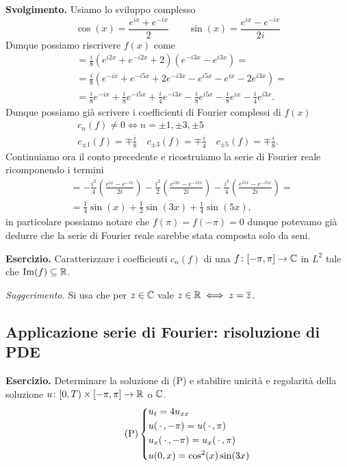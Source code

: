 \textbf{Svolgimento.}
Usiamo lo sviluppo complesso
$$
\cos(x) = \frac{e^{ix} + e^{-ix}}{2}
\qquad
\sin(x) = \frac{e^{ix} - e^{-ix}}{2i}
$$
Dunque possiamo riscrivere $f(x)$ come
$$
\begin{aligned}
	&= \frac{i}{8} \left( e^{i2x} + e^{-i2x} + 2 \right) \left( e^{-i3x} - e^{i3x} \right) = \\
	&= \frac{i}{8} \left( e^{-ix} + e^{-i5x} + 2e^{-i3x} - e^{i5x} - e^{ix} - 2e^{i3x} \right) = \\
	&= \frac{i}{8} e^{-ix} + \frac{i}{8} e^{-i5x} + \frac{i}{4} e^{-i3x} - \frac{i}{8} e^{i5x} - \frac{i}{8} e^{ix} - \frac{i}{4} e^{i3x}. 
\end{aligned}
$$
Dunque possiamo già scrivere i coefficienti di Fourier complessi di $f(x)$
$$
\begin{gathered}
	c_n(f) \neq 0 \iff n = \pm 1, \pm 3, \pm 5 \\
	c_{\pm 1}(f) = \mp\frac{i}{8}  
	\quad
	c_{\pm 3}(f) = \mp\frac{i}{4}
	\quad
	c_{\pm 5}(f) = \mp\frac{i}{8}.
\end{gathered}
$$
Continuiamo ora il conto precedente e ricostruiamo la serie di Fourier reale ricomponendo i termini
$$
\begin{aligned}
	&= -\frac{i^2}{4}\left( \frac{e^{ix} - e^{-ix}}{2i} \right) -\frac{i^2}{2}\left( \frac{e^{i3x} - e^{-i3x}}{2i} \right) -\frac{i^2}{4}\left( \frac{e^{i5x} - e^{-i5x}}{2i} \right) = \\
	&= \frac{1}{4} \sin(x) + \frac{1}{2} \sin(3x) + \frac{1}{4} \sin(5x),
\end{aligned}
$$
in particolare possiamo notare che $f(\pi) = f(-\pi) = 0$ dunque potevamo già dedurre che la serie di Fourier reale sarebbe stata composta solo da seni.

\textbf{Esercizio.}
Caratterizzare i coefficienti $c_n(f)$ di una $f \colon [-\pi, \pi] \to \mathbb C$ in $L^2$ tale che $\operatorname{Im}(f) \subseteq \mathbb R$.

\textit{Suggerimento.} Si usa che per $z \in \mathbb C$ vale $z \in \mathbb R \iff z = \overline z$.


\subsection{Applicazione serie di Fourier: risoluzione di PDE}

\textbf{Esercizio.}
Determinare la soluzione di (P) e stabilire unicità e regolarità della soluzione $u \colon [0, T) \times [-\pi, \pi] \to \mathbb R$ o $\mathbb C$.
\begin{equation}
	\tag{P}
	\left\{
	\begin{aligned}
		& u_t = 4 u_{xx} \\
		& u(\,\cdot\,, -\pi) = u(\,\cdot\,, \pi) \\
		& u_x(\,\cdot\,, -\pi) = u_x(\,\cdot\,, \pi) \\
		& u(0, x) = \cos^2(x) \sin(3x)
	\end{aligned}
	\right.
\end{equation}

